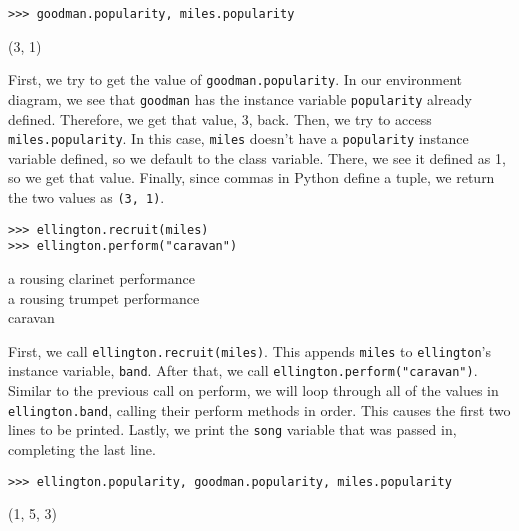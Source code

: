 \begin{blocksection}
\begin{lstlisting}
>>> goodman.popularity, miles.popularity
\end{lstlisting}
\begin{solution}[.2in]
(3, 1)

First, we try to get the value of \lstinline{goodman.popularity}. In our environment diagram, we see that \lstinline{goodman} has the instance variable \lstinline{popularity} already defined. Therefore, we get that value, 3, back. Then, we try to access \lstinline{miles.popularity}. In this case, \lstinline{miles} doesn’t have a \lstinline{popularity} instance variable defined, so we default to the class variable. There, we see it defined as 1, so we get that value. Finally, since commas in Python define a tuple, we return the two values as \lstinline{(3, 1)}.
\end{solution}

\vspace{1\baselineskip}

\begin{lstlisting}
>>> ellington.recruit(miles)
>>> ellington.perform("caravan")
\end{lstlisting}
\begin{solution}[.2in]
a rousing clarinet performance\\
a rousing trumpet performance\\
caravan

First, we call \lstinline{ellington.recruit(miles)}. This appends \lstinline{miles} to \lstinline{ellington}'s instance variable, \lstinline{band}. After that, we call \lstinline{ellington.perform("caravan")}. Similar to the previous call on perform, we will loop through all of the values in \lstinline{ellington.band}, calling their perform methods in order. This causes the first two lines to be printed. Lastly, we print the \lstinline{song} variable that was passed in, completing the last line.
\end{solution}

\vspace{2\baselineskip}

\begin{lstlisting}
>>> ellington.popularity, goodman.popularity, miles.popularity
\end{lstlisting}
\begin{solution}[.2in]
(1, 5, 3)
\end{solution}

\vspace{2\baselineskip}


\end{blocksection}

